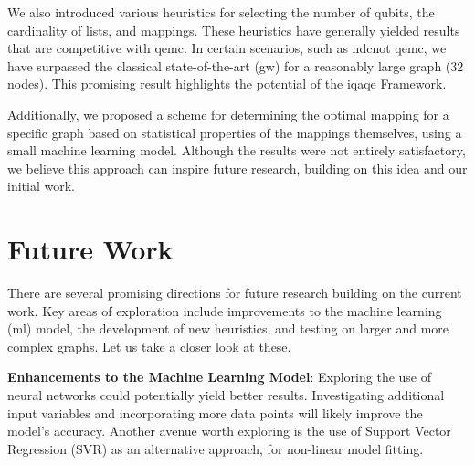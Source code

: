 We also introduced various heuristics for selecting the number of qubits, the cardinality of lists, and mappings. These heuristics have generally yielded results that are competitive with \acrshort{qemc}. In certain scenarios, such as \acrshort{ndcnot} \acrshort{qemc}, we have surpassed the classical state-of-the-art (\acrshort{gw}) for a reasonably large graph ($32$ nodes). This promising result highlights the potential of the \acrshort{iqaqe} Framework. %

Additionally, we proposed a scheme for determining the optimal mapping for a specific graph based on statistical properties of the mappings themselves, using a small machine learning model. Although the results were not entirely satisfactory, we believe this approach can inspire future research, building on this idea and our initial work. %


\section{Future Work}
\label{section:future}
There are several promising directions for future research building on the current work. Key areas of exploration include improvements to the machine learning (\acrshort{ml}) model, the development of new heuristics, and testing on larger and more complex graphs. Let us take a closer look at these.
\vspace{5mm}

\noindent\textbf{Enhancements to the Machine Learning Model}: %
\noindent Exploring the use of neural networks could potentially yield better results. Investigating additional input variables and incorporating more data points will likely improve the model's accuracy. Another avenue worth exploring is the use of Support Vector Regression (SVR) as an alternative approach, for non-linear model fitting.
\vspace{5mm}

